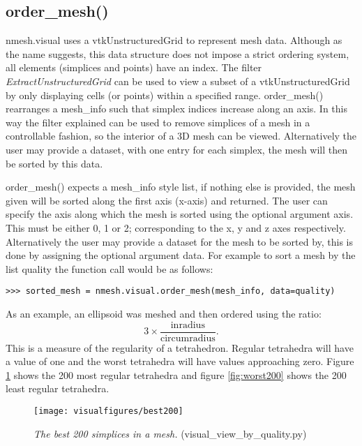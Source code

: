\subsection{{\ttfamily order\_mesh()}}
{\ttfamily nmesh.visual} uses a vtkUnstructuredGrid to represent mesh data. Although as the name suggests, this data structure does not impose a strict ordering system, all elements (simplices and points) have an index. The filter {\em ExtractUnstructuredGrid} can be used to view a subset of a vtkUnstructuredGrid by only displaying cells (or points) within a specified range. {\ttfamily order\_mesh()} rearranges a {\ttfamily mesh\_info} such that simplex indices increase along an axis. In this way the filter explained can be used to remove simplices of a mesh in a controllable fashion, so the interior of a 3D mesh can be viewed. Alternatively the user may provide a dataset, with one entry for each simplex, the mesh will then be sorted by this data. 

{\ttfamily order\_mesh()} expects a {\ttfamily mesh\_info} style list, if nothing else is provided, the mesh given will be sorted along the first axis (x-axis) and returned. The user can specify the axis along which the mesh is sorted using the optional argument {\ttfamily axis}. This must be either 0, 1 or 2; corresponding to the x, y and z axes respectively. Alternatively the user may provide a dataset for the mesh to be sorted by, this is done by assigning the optional argument {\ttfamily data}. For example to sort a mesh by the list {\ttfamily quality} the function call would be as follows:
\begin{lstlisting}[basicstyle=\small\ttfamily]
>>> sorted_mesh = nmesh.visual.order_mesh(mesh_info, data=quality)
\end{lstlisting}

As an example, an ellipsoid was meshed and then ordered using the ratio:
\[
3 \times \frac{\mathrm{inradius}}{\mathrm{circumradius}}.
\]
This is a measure of the regularity of a tetrahedron. Regular tetrahedra will have a value of one and the worst tetrahedra will have values approaching zero. Figure \ref{fig:best200} shows the 200 most regular tetrahedra and figure \ref{fig:worst200} shows the 200 least regular tetrahedra. 


\begin{figure}
\begin{center}
\texttt{[image: visualfigures/best200]}
\caption{{\em The best 200 simplices in a mesh. }(visual\_view\_by\_quality.py) \label{fig:best200}}
\end{center}
\end{figure}


